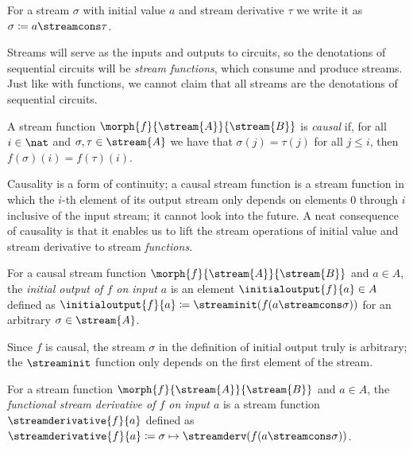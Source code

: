 \documentclass{lmcs}
\begin{document}
\begin{nota}
    For a stream \(\sigma\) with initial value \(a\) and stream derivative
    \(\tau\) we write it as \(\sigma \coloneqq a \streamcons \tau\).
\end{nota}

Streams will serve as the inputs and outputs to circuits, so the denotations of
sequential circuits will be \emph{stream functions}, which consume and produce
streams.
Just like with functions, we cannot claim that all streams are the
denotations of sequential circuits.

\begin{defi}
    A stream function \(\morph{f}{\stream{A}}{\stream{B}}\) is \emph{causal} if,
    for all \(i \in \nat\) and \(\sigma,\tau \in \stream{A}\) we have that
    \(\sigma(j) = \tau(j)\) for all \(j \leq i\), then
    \(f(\sigma)(i) = f(\tau)(i)\).
\end{defi}

Causality is a form of continuity; a causal stream function is a stream function
in which the \(i\)-th element of its output stream only depends on elements
\(0\) through \(i\) inclusive of the input stream; it cannot look into the
future.
A neat consequence of causality is that it enables us to lift the stream
operations of initial value and stream derivative to stream \emph{functions}.

\begin{defi}
    For a causal stream function \(\morph{f}{\stream{A}}{\stream{B}}\) and
    \(a \in A\), the \emph{initial output of \(f\) on input \(a\)} is an element
    \(\initialoutput{f}{a} \in A\) defined as
    \(\initialoutput{f}{a} \coloneqq \streaminit(f(a \streamcons \sigma))\) for
    an arbitrary \(\sigma \in \stream{A}\).
\end{defi}

Since \(f\) is causal, the stream \(\sigma\) in the definition of initial
output truly is arbitrary; the \(\streaminit\) function only depends on the
first element of the stream.

\begin{defi}
    For a stream function \(\morph{f}{\stream{A}}{\stream{B}}\) and
    \(a \in A\), the
    \emph{functional stream derivative of \(f\) on input \(a\)} is a stream
    function \(\streamderivative{f}{a}\) defined as \(
    \streamderivative{f}{a}
    \coloneqq
    \sigma \mapsto \streamderv(f(a \streamcons \sigma))
    \).
\end{defi}
\end{document}
